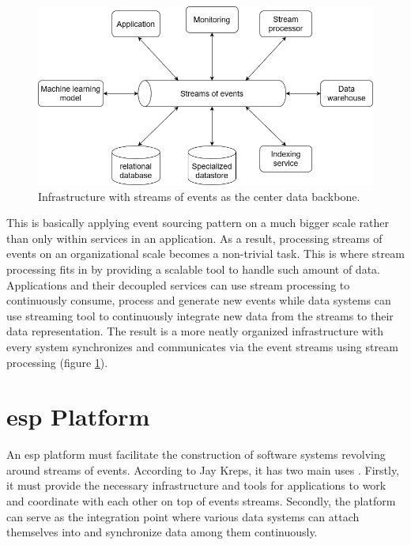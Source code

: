\begin{figure}[h]
	\centering
	\includegraphics[width=12.9cm]{images/eventstreamprocessing.png}
	\caption{Infrastructure with streams of events as the center data backbone.}
	\label{fig:eventstreamprocessingsystem}
\end{figure}

This is basically applying event sourcing pattern on a much bigger scale rather than only within services in an application. As a result, processing streams of events on an organizational scale becomes a non-trivial task. This is where stream processing fits in by providing a scalable tool to handle such amount of data. Applications and their decoupled services can use stream processing to continuously consume, process and generate new events while data systems can use streaming tool to continuously integrate new data from the streams to their data representation. The result is a more neatly organized infrastructure with every system synchronizes and communicates via the event streams using stream processing (figure \ref{fig:eventstreamprocessingsystem}). 




\section{\acrlong{esp} Platform} \label{section:general-ESP-platform}
An \acrshort{esp} platform must facilitate the construction of software systems revolving around streams of events. According to Jay Kreps, it has two main uses \cite{eventstreamingplatform}. Firstly, it must provide the necessary infrastructure and tools for applications to work and coordinate with each other on top of events streams. Secondly, the platform can serve as the integration point where various data systems can attach themselves into and synchronize data among them continuously.

